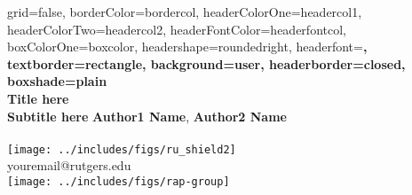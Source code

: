 \documentclass[a0paper,landscape,columns=3]{../includes/tex/baposter}
\begin{document}

\begin{poster}{
  grid=false,
  borderColor=bordercol,         %
  headerColorOne=headercol1,     %
  headerColorTwo=headercol2,     %
  headerFontColor=headerfontcol, %
  boxColorOne=boxcolor,          %
  headershape=roundedright,      %
  headerfont=\Large\sf\bf,       %
  textborder=rectangle,
  background=user,
  headerborder=closed,           %
  boxshade=plain
}
{}
%
%
{
 \sf\bf 
 \phantom{.} \\ 
 \vspace{0.2in}
 \LARGE{Title here} \\ 
 \Large{Subtitle here}
}
{
 \vspace{.6em} 
 \textbf{Author1 Name}, 
 \textbf{Author2 Name} \\ 
  \\
 {\vspace{-0.4in}\hspace{-10.40in}
  \texttt{[image: ../includes/figs/ru\_shield2]}\phantom{.}} \\
 {\vspace{-0.20in}\smaller youremail@rutgers.edu} \\
 {\vspace{-0.9in}\hspace{11.05in}
  \texttt{[image: ../includes/figs/rap-group]}}\vspace{-.6in}
}



%
%

\end{poster}
\end{document}

